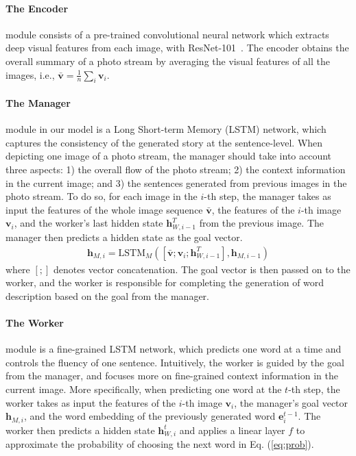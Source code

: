 \documentclass[letterpaper]{article} \usepackage{aaai20}  \usepackage{times}  \usepackage{helvet} \usepackage{courier}  \usepackage[hyphens]{url}  \usepackage{graphicx} \urlstyle{rm} \def\UrlFont{\rm}  \usepackage{graphicx}  \frenchspacing  \setlength{\pdfpagewidth}{8.5in}  \setlength{\pdfpageheight}{11in}  \usepackage{times}
\newcommand{\rbr}[1]{\left(#1\right)}
\newcommand{\hb}{\mathbf{h}}
\newcommand{\vb}{\mathbf{v}}
\newcommand{\eb}{\mathbf{e}}
\begin{document}
\paragraph{The Encoder} module consists of a pre-trained convolutional neural network which extracts deep visual features from each image, with ResNet-101~\cite{he2016deep}. The encoder obtains the overall summary of a photo stream by averaging the visual features of all the images, i.e., $\bar{\vb}=\frac{1}{n}\sum_i \vb_i$.

\paragraph{The Manager} module in our model is a Long Short-term Memory (LSTM) network, which captures the consistency of the generated story at the sentence-level. When depicting one image of a photo stream, the manager should take into account three aspects: 1) the overall flow of the photo stream; 2) the context information in the current image; and 3) the sentences generated from previous images in the photo stream. To do so, for each image in the $i$-th step, the manager takes as input the features of the whole image sequence $\bar{\vb}$, the features of the $i$-th image $\vb_i$, and the worker's last hidden state $\hb_{W,i-1}^T$ from the previous image. The manager then predicts a hidden state as the goal vector. 
\begin{align}
    \hb_{M,i} = \text{LSTM}_M\rbr{[\bar{\vb}; \vb_i; \hb_{W,i-1}^T], \hb_{M,i-1}} 
\end{align}
where $[;]$ denotes vector concatenation. The goal vector is then passed on to the worker, and the worker is responsible for completing the generation of word description based on the goal from the manager.  


\paragraph{The Worker} module is a fine-grained LSTM network, which predicts one word at a time and controls the fluency of one sentence. Intuitively, the worker is guided by the goal from the manager, and focuses more on fine-grained context information in the current image. More specifically, when predicting one word at the $t$-th step, the worker takes as input the features of the $i$-th image $\vb_i$, the manager's goal vector $\hb_{M,i}$, and the word embedding of the previously generated word $\eb_i^{t-1}$. The worker then predicts a hidden state $\hb_{W,i}^t$ and applies a linear layer $f$ to approximate the probability of choosing the next word in Eq. (\ref{eq:prob}). 
\end{document}
